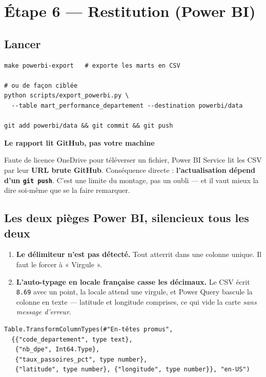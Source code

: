 \documentclass[11pt,a4paper]{article}
\newcommand{\cmd}[1]{\texttt{\small #1}}
\newcommand{\titrebloc}[1]{\textbf{\color{encre}#1}\par\vspace{0.25em}}
\begin{document}
\section{Étape 6 — Restitution (Power BI)}

\subsection{Lancer}

\begin{lstlisting}[style=sh]
make powerbi-export   # exporte les marts en CSV

# ou de façon ciblée
python scripts/export_powerbi.py \
  --table mart_performance_departement --destination powerbi/data

git add powerbi/data && git commit && git push
\end{lstlisting}

\begin{attention}
\titrebloc{Le rapport lit GitHub, pas votre machine}
Faute de licence OneDrive pour téléverser un fichier, Power BI Service lit les
CSV par leur \textbf{URL brute GitHub}. Conséquence directe :
\textbf{l'actualisation dépend d'un \cmd{git push}}. C'est une limite du
montage, pas un oubli — et il vaut mieux la dire soi-même que se la faire
remarquer.
\end{attention}

\subsection{Les deux pièges Power BI, silencieux tous les deux}

\begin{enumerate}
  \item \textbf{Le délimiteur n'est pas détecté.} Tout atterrit dans une
        colonne unique. Il faut le forcer à « Virgule ».
  \item \textbf{L'auto-typage en locale française casse les décimaux.} Le CSV
        écrit \cmd{8.69} avec un point, la locale attend une virgule, et Power
        Query bascule la colonne en texte — latitude et longitude comprises,
        ce qui vide la carte \emph{sans message d'erreur}.
\end{enumerate}

\begin{lstlisting}[style=sh]
Table.TransformColumnTypes(#"En-têtes promus",
  {{"code_departement", type text},
   {"nb_dpe", Int64.Type},
   {"taux_passoires_pct", type number},
   {"latitude", type number}, {"longitude", type number}}, "en-US")
\end{lstlisting}
\end{document}
